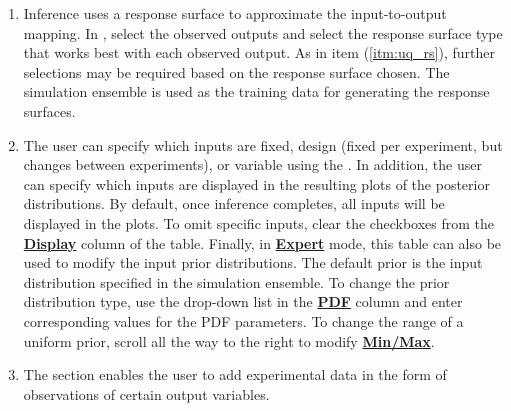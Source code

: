 \begin{enumerate}
Finally, the \textbf{\underline{Bayesian Inference of Ensemble}} dialog (shown in Figure \ref{fig:uq_inf})
is used to calculate the posterior distributions (prior distributions
integrated with data) of the uncertain input parameters. 
Inference utilizes Markov Chain Monte Carlo
(MCMC) to compute the posterior distributions, using response surfaces
that serve as fast approximations to the actual simulation model.


\begin{figure}[H]
\centering \texttt{[image: Chapt\_uq/figs/overview/5\_InferenceWizard2]}
\caption{Bayesian Inference Dialog}
\label{fig:uq_inf}
\end{figure}
\item
	Inference uses a response surface to approximate the
	input-to-output mapping. In , select the observed
	outputs and select the response surface type that works best with each
	observed output. As in item (\ref{itm:uq_rs}), further selections may be
	required based on	the response surface chosen. The simulation ensemble is used as the training data for
	generating the response surfaces.
\item
	The user can specify which inputs are fixed, design (fixed per
	experiment, but changes between experiments), or variable using
	the . In addition, the user can specify which
	inputs are displayed in the resulting plots of the posterior
	distributions. By default, once inference completes, all inputs will be
	displayed in the plots. To omit specific inputs, clear the checkboxes from
	the \textbf{\underline{Display}} column of the table.  
   Finally, in \textbf{\underline{Expert}} mode, this table can also be used to modify the input
	prior	distributions. The default prior is the input
	distribution specified in the simulation ensemble. 
   To change the prior distribution type, use the drop-down list in the \textbf{\underline{PDF}}
	column and enter corresponding values for the PDF parameters. 
   To change the range of a uniform prior, scroll all the way to the right
	to modify \textbf{\underline{Min/Max}}. 
\item
	The  section enables the user to add experimental data
   in the form of observations of certain output variables.

\end{enumerate}
